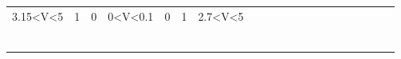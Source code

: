\begin{center}
\begin{table}[]
\begin{tabular}{llllllllllllllllllll}
\multicolumn{1}{|c|}{3.15\textless{}V\textless{}5}                     & \multicolumn{1}{c|}{1}                  & \multicolumn{1}{c|}{0}                  & \multicolumn{1}{c|}{0\textless{}V\textless{}0.1} & \multicolumn{1}{c|}{0}           & \multicolumn{1}{c|}{1}            & \multicolumn{1}{c|}{2.7\textless{}V\textless{}5}   &  &  &  &  &  &  &  &  &  &  &  &  &  \\ \cline{1-7}
\multicolumn{1}{c}{}                                                   & \multicolumn{1}{c}{}                    & \multicolumn{1}{c}{}                    & \multicolumn{1}{c}{}                             & \multicolumn{1}{c}{}             & \multicolumn{1}{c}{}              &                                                    &  &  &  &  &  &  &  &  &  &  &  &  &  \\
\multicolumn{1}{c}{}                                                   & \multicolumn{1}{c}{}                    & \multicolumn{1}{c}{}                    & \multicolumn{1}{c}{}                             & \multicolumn{1}{c}{}             & \multicolumn{1}{c}{}              &                                                    &  &  &  &  &  &  &  &  &  &  &  &  &  \\
\multicolumn{1}{c}{}                                                   & \multicolumn{1}{c}{}                    & \multicolumn{1}{c}{}                    & \multicolumn{1}{c}{}                             & \multicolumn{1}{c}{}             & \multicolumn{1}{c}{}              &                                                    &  &  &  &  &  &  &  &  &  &  &  &  &  \\
\multicolumn{1}{c}{}                                                   & \multicolumn{1}{c}{}                    & \multicolumn{1}{c}{}                    & \multicolumn{1}{c}{}                             & \multicolumn{1}{c}{}             & \multicolumn{1}{c}{}              &                                                    &  &  &  &  &  &  &  &  &  &  &  &  &  \\
\multicolumn{1}{c}{}                                                   & \multicolumn{1}{c}{}                    & \multicolumn{1}{c}{}                    & \multicolumn{1}{c}{}                             & \multicolumn{1}{c}{}             &                                   &                                                    &  &  &  &  &  &  &  &  &  &  &  &  &  \\
\multicolumn{1}{c}{}                                                   & \multicolumn{1}{c}{}                    & \multicolumn{1}{c}{}                    & \multicolumn{1}{c}{}                             & \multicolumn{1}{c}{}             &                                   &                                                    &  &  &  &  &  &  &  &  &  &  &  &  &  \\

\end{tabular}
\end{table}
\end{center}
